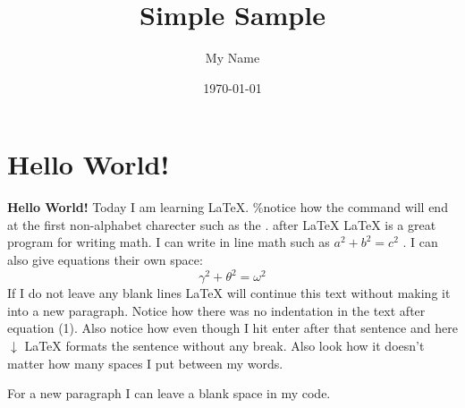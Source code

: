 \documentclass{article} %
\title{Simple Sample} %
\author{My Name} %
\date{\today} %
\begin{document}
    \maketitle %

    \section{Hello World!} %

    \textbf{Hello World!} Today I am learning \LaTeX. \%notice how the command will end at the first non-alphabet charecter such as the . after \LaTeX
     \LaTeX{} is a great program for writing math.
I can write in line math such as $a^2+b^2=c^2$ %
     . I can also give equations their own space:
    \begin{equation} %
    \gamma^2+\theta^2=\omega^2
    \end{equation}
    If I do not leave any blank lines \LaTeX{} will continue  this text without making it into a new paragraph.
Notice how there was no indentation in the text after equation (1).
    Also notice how even though I hit enter after that sentence and here $\downarrow$
     \LaTeX{} formats the sentence without any break.
Also   look  how      it   doesn't     matter          how    many  spaces     I put     between       my    words.

    For a new paragraph I can leave a blank space in my code.
\end{document}
